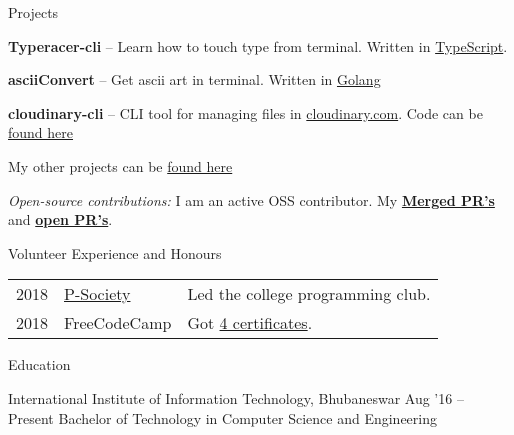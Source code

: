 \documentclass{resume} %
\begin{document}

\begin{rSection}{Projects}
  \begin{rProjectSection}
    \item \textbf {Typeracer-cli} -- Learn how to touch type from terminal. Written in \href{https://github.com/p-society/typeracer-cli/}{TypeScript}.
    \item \textbf {asciiConvert} -- Get ascii art in terminal. Written in \href{https://github.com/knrt10/asciiConvert/}{Golang}
    \item \textbf {cloudinary-cli} -- CLI tool for managing files in \href{https://cloudinary.com/}{cloudinary.com}. Code can be \href{https://github.com/knrt10/cloudinary-cli/}{found here}
    \item My other projects can be \href{https://knrt10.github.io/projects/}{found here}
  \end{rProjectSection}

  \begin{rBlurbSection}
    \item {\em Open-source contributions:}
      I am an active OSS contributor. My \href{http://bit.ly/2kdr9Ui}{\textbf{Merged PR's}} and \href{http://bit.ly/2kxjvV9}{\textbf{open PR's}}.
  \end{rBlurbSection}
\end{rSection}


\begin{rSection}{Volunteer Experience and Honours}
  \begin{tabular}{rll}
2018	     & {\href{https://github.com/p-society/}{P-Society}}  & Led the college programming club.\\
2018	     & FreeCodeCamp  & Got \href{https://www.freecodecamp.org/knrt10/}{4 certificates}.\\
\end{tabular}
\end{rSection}


\begin{rSection}{Education}
  \begin{rEducationSection}{International Institute of Information Technology, Bhubaneswar}
                           {Aug '16 -- Present}
                           {Bachelor of Technology in Computer Science and Engineering}
  \end{rEducationSection}
\end{rSection}
\end{document}
